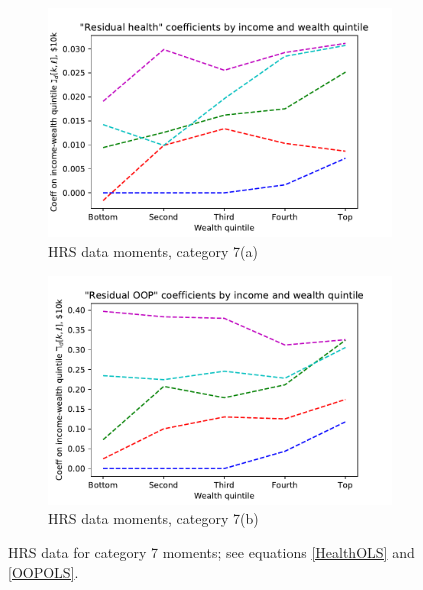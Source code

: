 \documentclass[12pt,pdftex,letterpaper]{article}
\begin{document}
\begin{figure}[h!]
    \centering
    \begin{subfigure}[b]{0.49\textwidth}
        \centering
        \includegraphics[width=\textwidth]{../Figures/HealthCoeffByIncWealthDataOnly.pdf}
        \caption{HRS data moments, category 7(a)}
    \end{subfigure}
    \begin{subfigure}[b]{0.49\textwidth}
        \centering
        \includegraphics[width=\textwidth]{../Figures/OOPcoeffByIncWealthDataOnly.pdf}
        \caption{HRS data moments, category 7(b)}
    \end{subfigure}
    \caption{HRS data for category 7 moments; see equations \eqref{HealthOLS} and \eqref{OOPOLS}.}
    \label{fig:MomentCat7DataOnly}
\end{figure}


\newpage
\end{document}
